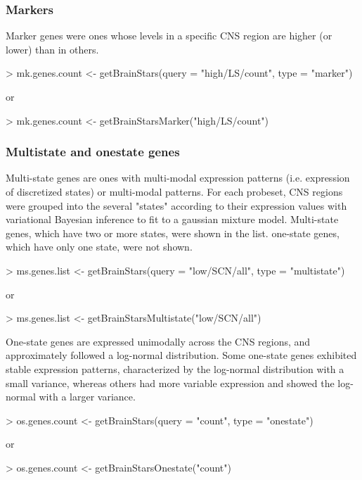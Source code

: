 \documentclass[12pt,fullpage]{article}
\begin{document}
\subsubsection{Markers}
Marker genes were ones whose levels in a specific CNS region are higher (or lower) than in others.
\begin{Schunk}
\begin{Sinput}
> mk.genes.count <- getBrainStars(query = "high/LS/count", type = "marker")
\end{Sinput}
\end{Schunk}
or
\begin{Schunk}
\begin{Sinput}
> mk.genes.count <- getBrainStarsMarker("high/LS/count")
\end{Sinput}
\end{Schunk}
\subsubsection{Multistate and onestate genes}
Multi-state genes are ones with multi-modal expression patterns (i.e. expression of discretized states) or multi-modal patterns. For each probeset, CNS regions were grouped into the several "states" according to their expression values with variational Bayesian inference to fit to a gaussian mixture model. Multi-state genes, which have two or more states, were shown in the list. one-state genes, which have only one state, were not shown.
\begin{Schunk}
\begin{Sinput}
> ms.genes.list <- getBrainStars(query = "low/SCN/all", type = "multistate")
\end{Sinput}
\end{Schunk}
or
\begin{Schunk}
\begin{Sinput}
> ms.genes.list <- getBrainStarsMultistate("low/SCN/all")
\end{Sinput}
\end{Schunk}

One-state genes are expressed unimodally across the CNS regions, and approximately followed a log-normal distribution. Some one-state genes exhibited stable expression patterns, characterized by the log-normal distribution with a small variance, whereas others had more variable expression and showed the log-normal with a larger variance.
\begin{Schunk}
\begin{Sinput}
> os.genes.count <- getBrainStars(query = "count", type = "onestate")
\end{Sinput}
\end{Schunk}
or
\begin{Schunk}
\begin{Sinput}
> os.genes.count <- getBrainStarsOnestate("count")
\end{Sinput}
\end{Schunk}
\end{document}
